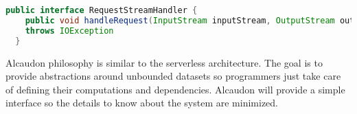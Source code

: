 \begin{lstlisting}[language=java, frame=trBL, label=code:lambdalisting, float=ht, caption = {AWS Lambda Interface}]
  public interface RequestStreamHandler {
    public void handleRequest(InputStream inputStream, OutputStream outputStream, Context context)
    throws IOException
  }
\end{lstlisting}

Alcaudon philosophy is similar to the serverless architecture. The goal is to
provide abstractions around unbounded datasets so programmers just take care of
defining their computations and dependencies. Alcaudon will provide a simple
interface so the details to know about the system are minimized.
